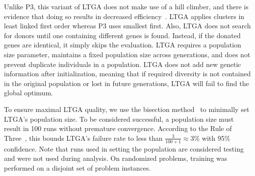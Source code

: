 \documentclass{sig-alternate}
\begin{document}
Unlike P3, this variant of LTGA does not make use of a hill climber,
and there is evidence that doing so results in decreased
efficiency~\cite{bosman:2011:lsbbo}.  LTGA applies clusters in least
linked first order whereas P3 uses smallest first.  Also, LTGA does
not search for donors until one containing different genes is found.
Instead, if the donated genes are identical, it simply skips the
evaluation.  LTGA requires a population size parameter, maintains a
fixed population size across generations, and does not prevent
duplicate individuals in a population.  LTGA does not add new genetic
information after initialization, meaning that if required diversity
is not contained in the original population or lost in future
generations, LTGA will fail to find the global optimum.

To ensure maximal LTGA quality, we use the bisection method~\cite{goldman:2012:ltga}
to minimally set LTGA's population size.  To be considered successful, a
population size must result in 100 runs without premature convergence.
According to the Rule of Three~\cite{jovanovic:1997:ruleofthree}, this bounds
LTGA's failure rate to less than $\frac{3}{100+1} \approx 3\%$ with 95\% confidence.
Note that runs used in setting the population are considered testing and were not
used during analysis.  On randomized problems, training was performed on a disjoint
set of problem instances.

\begin{comment}
Since LTGA requires a population size parameter, we thought it most fair to
compare against LTGA with an optimized population size, even though P3
receives no such tuning. To set the population size parameter, we use
the bisection method~\cite{goldman:2012:ltga}, which determines the minimum population
size required to meet a specified success criteria.  As P3 will run until the global optima
is found or the evaluation limit is reached, we want to ensure LTGA has a similar requirement
on its success.  Therefore, using the Rule of Three~\cite{jovanovic:1997:ruleofthree}, we
can provide a bound on the probability of failure $\frac{3}{k+1}$ with $95\%$ confidence,
where $k$ is a number of runs without a failure.  Here we state that a population size
is successful if it performs 100 runs without failing to find the global optimum, meaning
the probability of that population failing to solve problems of the same class is bounded above by
$3\%$.  Note that these 100 runs are considered training, and the results from the bisection
runs are not included during the comparative testing.  Furthermore, when testing on problem
classes, bisection is performed on a different set of instances than testing.
\end{comment}
\end{document}
